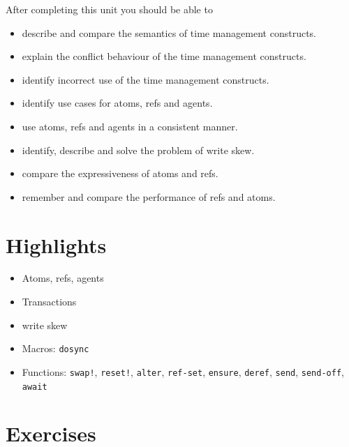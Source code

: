 \documentclass[11pt,a4paper]{article}
\begin{document}
After completing this unit you should be able to

\begin{itemize}
	\item describe and compare the semantics of time management constructs.
    \item explain the conflict behaviour of the time management constructs.
    \item identify incorrect use of the time management constructs.
    \item identify use cases for atoms, refs and agents.
    \item use atoms, refs and agents in a consistent manner.
    \item identify, describe and solve the problem of write skew.
    \item compare the expressiveness of atoms and refs.
    \item remember and compare the performance of refs and atoms.
\end{itemize}

\section{Highlights}

\begin{itemize}
    \item Atoms, refs, agents
    \item Transactions
    \item write skew
    \item Macros: \verb|dosync|
    \item Functions: \verb|swap!|, \verb|reset!|, \verb|alter|, \verb|ref-set|, \verb|ensure|, \verb|deref|, \verb|send|, \verb|send-off|, \verb|await|
\end{itemize}



\section{Exercises}
\end{document}
